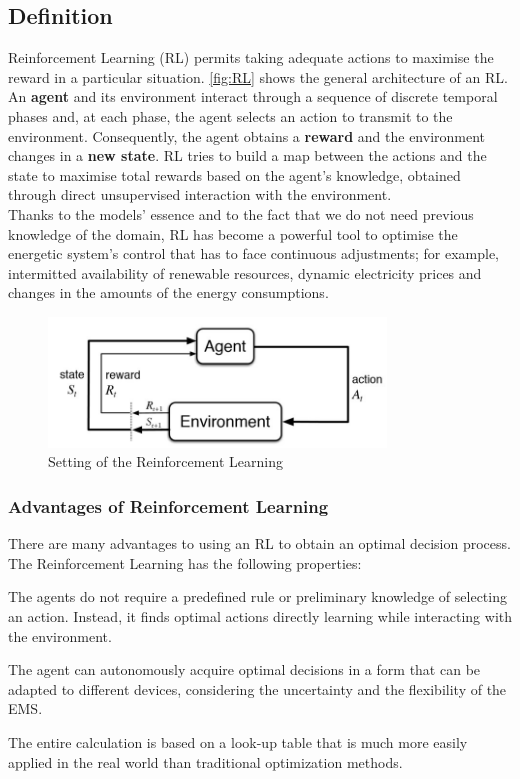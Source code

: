 \subsection{Definition}
Reinforcement Learning (RL) permits taking adequate actions to maximise the reward in a particular situation. \autoref{fig:RL} shows the general architecture of an RL. An \textbf{agent} and its environment interact through a sequence of discrete temporal phases and, at each phase, the agent selects an action to transmit to the environment. Consequently, the agent obtains a \textbf{reward} and the environment changes in a \textbf{new state}. RL tries to build a map between the actions and the state to maximise total rewards based on the agent's knowledge, obtained through direct unsupervised interaction with the environment.\\
Thanks to the models' essence and to the fact that we do not need previous knowledge of the domain, RL has become a powerful tool to optimise the energetic system's control that has to face continuous adjustments; for example, intermitted availability of renewable resources, dynamic electricity prices and changes in the amounts of the energy consumptions.

\begin{figure}[h]
    \centering
    \includegraphics[width=0.8\textwidth]{RL immagini/RL.jpg}
    \caption{Setting of the Reinforcement Learning}
    \label{fig:RL}
\end{figure}

\subsubsection{Advantages of Reinforcement Learning}
There are many advantages to using an RL to obtain an optimal decision process. \\
The Reinforcement Learning has the following properties:
\begin{description}
\addtolength{\itemindent}{0.5cm}
    \item [Free of models] The agents do not require a predefined rule or preliminary knowledge of selecting an action. Instead, it finds optimal actions directly learning while interacting with the environment.
    \item [Adaptive] The agent can autonomously acquire optimal decisions in a form that can be adapted to different devices, considering the uncertainty and the flexibility of the EMS.
    \item [Coincided] The entire calculation is based on a look-up table that is much more easily applied in the real world than traditional optimization methods.
\end{description}

